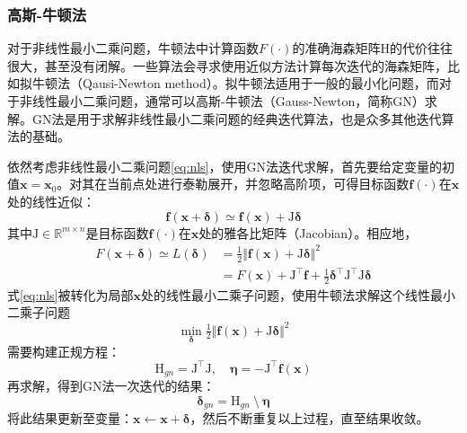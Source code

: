 \subsubsection*{高斯-牛顿法}

对于非线性最小二乘问题，牛顿法中计算函数$F(\cdot)$的准确海森矩阵$\mathrm{H}$的代价往往很大，甚至没有闭解。一些算法会寻求使用近似方法计算每次迭代的海森矩阵，比如拟牛顿法\citep{tingleff2004methods}（Qausi-Newton method）。拟牛顿法适用于一般的最小化问题，而对于非线性最小二乘问题，通常可以高斯-牛顿法（Gauss-Newton，简称GN）求解。GN法是用于求解非线性最小二乘问题的经典迭代算法，也是众多其他迭代算法的基础。

依然考虑非线性最小二乘问题\eqref{eq:nls}，使用GN法迭代求解，首先要给定变量的初值$\bm{x}=\bm{x}_0$。对其在当前点处进行泰勒展开，并忽略高阶项，可得目标函数$\bm{f}(\cdot)$在$\bm{x}$处的线性近似：
\begin{equation}
    \bm{f}(\bm{x}+\bm{\delta}) \simeq \bm{f}(\bm{x}) + \mathrm{J}\bm{\delta}
\end{equation}
其中$\mathrm{J}\in\mathbb{R}^{m \times n}$是目标函数$\bm{f}(\cdot)$在$\bm{x}$处的雅各比矩阵（Jacobian）。相应地，
\begin{equation}
\begin{aligned}
    F(\bm{x}+\bm{\delta}) \simeq L(\bm{\delta})
        &= \tfrac{1}{2} \Vert \bm{f}(\bm{x}) + \mathrm{J}\bm{\delta} \Vert^2 \\
        &= F(\bm{x}) + \mathrm{J}^\top\bm{f} +
           \tfrac{1}{2}\bm{\delta}^\top\mathrm{J}^\top\mathrm{J}\bm{\delta}
\end{aligned}
\label{eq:linmod}
\end{equation}
式\eqref{eq:nls}被转化为局部$\bm{x}$处的线性最小二乘子问题，使用牛顿法求解这个线性最小二乘子问题
\begin{equation}
    \min_{\bm{\delta}} \tfrac{1}{2}
    \Vert \bm{f}(\bm{x}) + \mathrm{J}\bm{\delta} \Vert^2
    \label{eq:lls}
\end{equation}
需要构建正规方程：
\begin{equation}
    \mathrm{H}_{gn} = \mathrm{J}^\top\mathrm{J}, \quad
    \bm{\eta}       = -\mathrm{J}^\top\bm{f}(\bm{x})
    \label{eq:normal_eq}
\end{equation}
再求解，得到GN法一次迭代的结果：
\begin{equation}
    \bm{\delta}_{gn} = \mathrm{H}_{gn} \:\setminus\: \bm{\eta}
    \label{eq:gn}
\end{equation}
将此结果更新至变量：$\bm{x}\leftarrow\bm{x}+\bm{\delta}$，然后不断重复以上过程，直至结果收敛。

